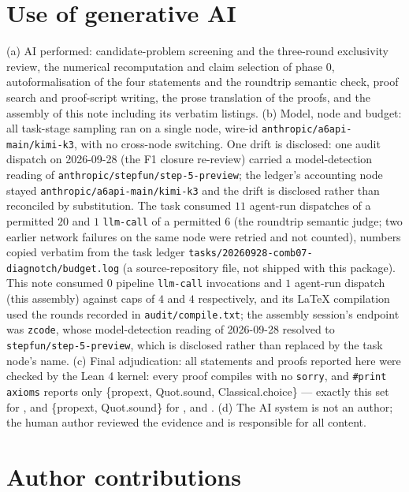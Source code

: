 \documentclass[11pt]{article}
\theoremstyle{definition}
\begin{document}
\section*{Use of generative AI}

(a) AI performed: candidate-problem screening and the three-round exclusivity
review, the numerical recomputation and claim selection of phase 0,
autoformalisation of the four statements and the roundtrip semantic check,
proof search and proof-script writing, the prose translation of the proofs,
and the assembly of this note including its verbatim listings. (b) Model, node
and budget: all task-stage sampling ran on a single node, wire-id
\texttt{anthropic/a6api-main/kimi-k3}, with no cross-node switching. One drift
is disclosed: one audit dispatch on 2026-09-28 (the F1 closure re-review)
carried a model-detection reading of
\texttt{anthropic/stepfun/step-5-preview}; the ledger's accounting node stayed
\texttt{anthropic/a6api-main/kimi-k3} and the drift is disclosed rather than
reconciled by substitution. The task consumed $11$ agent-run dispatches of a
permitted $20$ and $1$ \texttt{llm-call}
of a permitted $6$ (the roundtrip semantic judge; two earlier network failures
on the same node were retried and not counted), numbers copied verbatim from
the task ledger \texttt{tasks/20260928-comb07-diagnotch/budget.log} (a
source-repository file, not shipped with this package). This note consumed $0$
pipeline \texttt{llm-call} invocations and $1$ agent-run dispatch (this
assembly) against caps of $4$ and $4$ respectively, and its LaTeX compilation
used the rounds recorded in \texttt{audit/compile.txt}; the assembly session's
endpoint was \texttt{zcode}, whose model-detection reading of 2026-09-28
resolved to \texttt{stepfun/step-5-preview}, which is disclosed rather than
replaced by the task node's name. (c) Final adjudication: all statements and
proofs reported here were checked by the Lean 4 kernel: every proof compiles
with no \texttt{sorry}, and \texttt{\#print axioms} reports only \{propext,
Quot.sound, Classical.choice\} --- exactly this set for ,
and \{propext, Quot.sound\} for ,
 and . (d) The AI
system is not an author; the human author reviewed the evidence and is
responsible for all content.

\section*{Author contributions}
\end{document}
